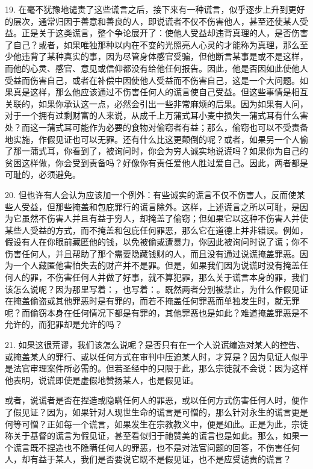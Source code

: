 19. 在毫不犹豫地谴责了这些谎言之后，接下来有一种谎言，似乎逐步上升到更好的层次，通常归因于善意和善良的人，即说谎者不仅不伤害他人，甚至还使某人受益。正是关于这类谎言，整个争论展开了：使他人受益却违背真理的人，是否伤害了自己？或者，如果唯独那种以内在不变的光照亮人心灵的才能称为真理，那么至少他违背了某种真实的事，因为尽管身体感官受骗，但他断言某事是或不是这样，而他的心灵、感官、意见或信仰都没有给他任何报告。因此，他是否因如此使他人受益而伤害自己，或者在补偿中因使他人受益而不伤害自己，这是一个大问题。如果真是这样，那么他应该通过不伤害任何人的谎言使自己受益。但这些事情是相互关联的，如果你承认这一点，必然会引出一些非常麻烦的后果。因为如果有人问，对于一个拥有过剩财富的人来说，从成千上万蒲式耳小麦中损失一蒲式耳有什么害处？而这一蒲式耳可能作为必要的食物对偷窃者有益；那么，偷窃也可以不受责备地实施，作假见证也可以无罪。还有什么比这更颠倒的呢？或者，如果另一个人偷了那一蒲式耳，你看到了，被询问时，你会为穷人诚实地说谎吗？如果你为自己的贫困这样做，你会受到责备吗？好像你有责任爱他人胜过爱自己。因此，两者都是可耻的，必须避免。\par

20. 但也许有人会认为应该加一个例外：有些诚实的谎言不仅不伤害人，反而使某些人受益，但那些掩盖和包庇罪行的谎言除外。这样，上述谎言之所以可耻，是因为它虽然不伤害人并且有益于穷人，却掩盖了偷窃；但如果它以这种不伤害人并使某些人受益的方式，而不掩盖和包庇任何罪恶，那么它在道德上并非错误。例如，假设有人在你眼前藏匿他的钱，以免被偷或遭暴力，你因此被询问时说了谎；你不伤害任何人，并且帮助了那个需要隐藏钱财的人，而且没有通过说谎掩盖罪恶。因为一个人藏匿他害怕失去的财产并不是罪。但是，如果我们因为说谎时没有掩盖任何人的罪，不伤害任何人并做了好事，就不算犯罪，那么关于谎言本身的罪，我们该怎么说呢？因为那里写着：，也写着：。既然两者分别被禁止，为什么作假见证在掩盖偷盗或其他罪恶时是有罪的，而若不掩盖任何罪恶而单独发生时，就无罪呢？而偷窃本身在任何情况下都是有罪的，其他罪恶也是如此？难道掩盖罪恶是不允许的，而犯罪却是允许的吗？\par

21. 如果这很荒谬，我们该怎么说呢？是否只有在一个人说谎编造对某人的控告、或掩盖某人的罪行、或以任何方式在审判中压迫某人时，才算是？因为见证人似乎是法官审理案件所必需的。但若圣经中的只限于此，那么宗徒就不会说：因为这样他表明，说谎即使是虚假地赞扬某人，也是假见证。\par

或者，说谎者是否在捏造或隐瞒任何人的罪恶，或以任何方式伤害任何人时，便作了假见证？因为，如果针对人现世生命的谎言是可憎的，那么针对永生的谎言更是何等可憎？正如每一个谎言，如果发生在宗教教义中，便是如此。正是为此，宗徒称关于基督的谎言为假见证，甚至看似归于祂赞美的谎言也是如此。那么，如果一个谎言既不捏造也不隐瞒任何人的罪恶，也不是对法官问题的回答，不伤害任何人，却有益于某人，我们是否要说它既不是假见证，也不是应受谴责的谎言？\par

